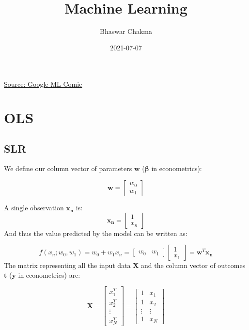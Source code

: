 \documentclass[
]{book}
\title{Machine Learning}
\author{Bhaswar Chakma}
\date{2021-07-07}
\begin{document}
\maketitle

{
\setcounter{tocdepth}{1}
\tableofcontents
}
\hypertarget{section}{%
\chapter*{}\label{section}}

\href{https://cloud.google.com/products/ai/ml-comic-1/}{Source: Google ML Comic}

\hypertarget{ols}{%
\chapter{OLS}\label{ols}}

\hypertarget{slr}{%
\section{SLR}\label{slr}}

We define our column vector of parameters \(\mathbf{w}\)
(\(\boldsymbol{\beta}\) in econometrics):

\[\mathbf{w} = \begin{bmatrix}
           w_{0} \\
           w_{1} 
         \end{bmatrix}\]

A single observation \(\mathbf{x_n}\) is: \[
  \mathbf{x_n} =
  \begin{bmatrix}
          1 \\
          x_{n} 
  \end{bmatrix}
\] And thus the value predicted by the model can be written as:

\[
  f(x_n; w_0, w_1) = 
  w_0 + w_1x_n = 
  \begin{bmatrix}
  w_0 & w_1
  \end{bmatrix}
  \begin{bmatrix}
  1 \\ x_1
  \end{bmatrix} = 
  \mathbf{w}^T\mathbf{x_n}
\] The matrix representing all the input data \(\mathbf{X}\) and the
column vector of outcomes \(\mathbf{t}\) (\(\mathbf{y}\) in econometrics)
are:

\[
\mathbf{X} = 
\begin{bmatrix}
x_{1}^T \\
x_{2}^T \\
\vdots \\
x_{N}^T
\end{bmatrix}
= \begin{bmatrix}
1 & x_{1} \\
1 & x_{2} \\
\vdots & \vdots\\
1 & x_{N}
\end{bmatrix}
\]
\end{document}
